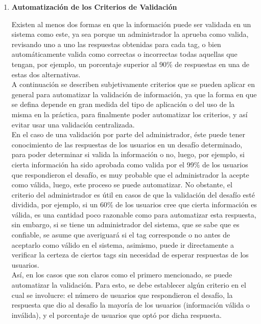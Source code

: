 \documentclass[10pt,letterpaper]{article}
\begin{document}
\begin{enumerate}

\item \textbf{Automatización de los Criterios de Validación}

Existen al menos dos formas en que la información puede ser validada en un sistema como este, ya sea porque un administrador la aprueba como valida, revisando uno a uno las respuestas obtenidas para cada tag, o bien automáticamente valida como correctas o incorrectas todas aquellas que tengan, por ejemplo, un porcentaje superior al 90\% de respuestas en una de estas dos alternativas.\\

A continuación se describen subjetivamente criterios que se pueden aplicar en general para automatizar la validación de información, ya que la forma en que se defina depende en gran medida del tipo de aplicación o del uso de la misma en la práctica, para finalmente poder automatizar los criterios, y así evitar usar una validación centralizada.\\

En el caso de una validación por parte del administrador, éste puede tener conocimiento de las respuestas de los usuarios en un desafío determinado, para poder determinar si valida la información o no, luego, por ejemplo, si cierta información ha sido aprobada como valida por el 99\% de los usuarios que respondieron el desafío, es muy probable que el administrador la acepte como válida, luego, este proceso se puede automatizar. No obstante, el criterio del administrador es útil en casos de que la validación del desafío esté dividida, por ejemplo, si un 60\% de los usuarios cree que cierta información es válida, es una cantidad poco razonable como para automatizar esta respuesta, sin embargo, si se tiene un administrador del sistema, que se sabe que es confiable, se asume que averiguará si el tag corresponde o no antes de aceptarlo como válido en el sistema, asimismo, puede ir directamente a verificar la certeza de ciertos tags sin necesidad de esperar respuestas de los usuarios.\\

Así, en los casos que son claros como el primero mencionado, se puede automatizar la validación. Para esto, se debe establecer algún criterio en el cual se involucre: el número de usuarios que respondieron el desafío, la respuesta que dio al desafío la mayoría de los usuarios (información válida o inválida), y el porcentaje de usuarios que optó por dicha respuesta.\\


\end{enumerate}
\end{document}
